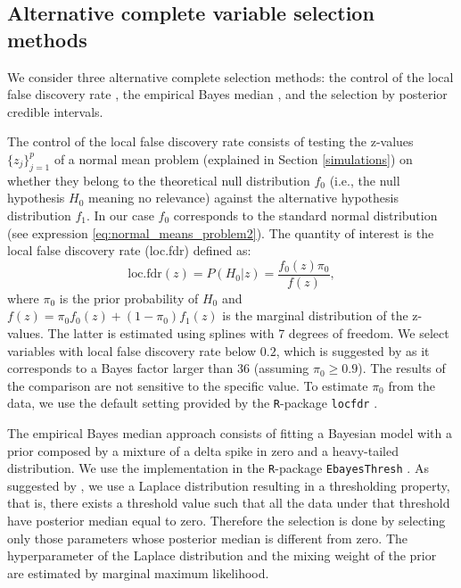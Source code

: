 \documentclass[a4]{article}
\theoremstyle{definition}
\begin{document}
\subsection{Alternative complete variable selection methods}

We consider three alternative complete selection methods:
 the control of the local
false discovery rate \citep{paper:efron, efron2012large}, the
empirical Bayes median \citep{johnstone2004needles}, and the selection
by posterior credible intervals.

The control of the local false discovery rate consists of testing the
z-values $\{z_{j}\}_{j=1}^{p}$ of a normal mean problem (explained in Section \ref{simulations}) 
on whether they belong to the
theoretical null distribution $f_{0}$ (i.e., the null hypothesis $H_0$
meaning no relevance) against the alternative hypothesis distribution
$f_{1}$. In our case $f_{0}$ corresponds to the standard normal
distribution (see expression \eqref{eq:normal_means_problem2}). The
quantity of interest is the local false discovery rate (loc.fdr)
defined as: \
\begin{equation}
\text{loc.fdr}(z)=P(H_{0}|z)=\frac{f_{0}(z)\pi_{0}}{f(z)},
\end{equation}
where $\pi_{0}$ is the prior probability of $H_0$ and
$f(z)=\pi_{0}f_{0}(z)+(1-\pi_{0})f_{1}(z)$ is the marginal
distribution of the z-values. The latter is estimated using splines
with 7 degrees of freedom. We select variables with local false
discovery rate below $0.2$, which is suggested by
\citet{efron2012large} as it corresponds to a Bayes factor larger than
36 (assuming $\pi_{0}\geq0.9$). The results of the comparison are not
sensitive to the specific value. To estimate $\pi_{0}$ from the data,
we use the default setting provided by the \texttt{R}-package
\texttt{locfdr} \citep{Efron+Turnbull+Narasimhan:2015:locfdr}.

The empirical Bayes median approach consists of fitting a Bayesian
model with a prior composed by a mixture of a delta spike in zero and
a heavy-tailed distribution. We use the implementation in the
\texttt{R}-package \texttt{EbayesThresh}
\citep{Silverman+etal:2017:EbayesThresh}. As suggested by
\cite{johnstone2004needles}, we use a Laplace distribution resulting
in a thresholding property, that is, there exists a threshold value
such that all the data under that threshold have posterior median
equal to zero. Therefore the selection is done by selecting only those
parameters whose posterior median is different from zero. The
hyperparameter of the Laplace distribution and the mixing weight of
the prior are estimated by marginal maximum likelihood.
\end{document}
